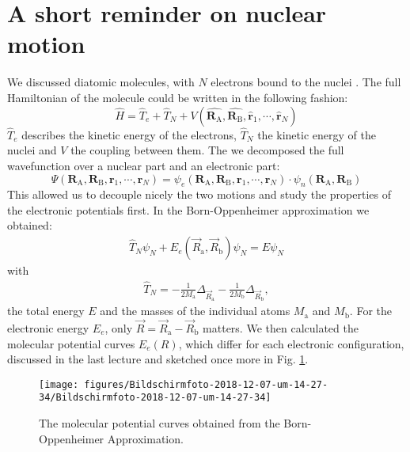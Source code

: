 \documentclass[10pt]{article}
\let\cite\citep
\providecommand\citep{\cite}
\newcommand{\vecRA}{\mathbf{R}_\mathrm{A}}
\newcommand{\vecRB}{\mathbf{R}_\mathrm{B}}
\begin{document}
\section{A short reminder on nuclear motion}
We discussed diatomic molecules, with $N$ electrons bound to the nuclei  \cite{molecules}. The full Hamiltonian of the molecule could be written in the following fashion:
\begin{equation}
\hat{H} = \hat{T}_e + \hat{T}_N + V(\hat{\vecRA}, \hat{\vecRB},\hat{\mathbf{r}}_1,\cdots, \hat{\mathbf{r}}_N)
\end{equation}
$\hat{T}_e$ describes the kinetic energy of the electrons, $\hat{T}_N$ the kinetic energy of the nuclei and $V$ the coupling between them. The we decomposed the full wavefunction over a nuclear part and an electronic part:
\begin{equation}
\Psi(\vecRA, \vecRB, \mathbf{r}_1,\cdots, \mathbf{r}_N) = \psi_e(\vecRA, \vecRB, \mathbf{r}_1,\cdots, \mathbf{r}_N)\cdot \psi_n(\vecRA, \vecRB)
\end{equation}
This allowed us to decouple nicely the two motions and study the properties of the electronic potentials first. In the Born-Oppenheimer approximation we obtained:
\begin{align}\label{Eq:NuclearMotion}
\hat{T}_N \psi_N + E_e (\vec{R}_\textrm{a}, \vec{R}_\textrm{b}) \psi_N = E \psi_N
\end{align}
%
with
\begin{align}
\hat{T}_N = - \frac{1}{2 M_\textrm{a}} \Delta_{\vec{R}_\textrm{a}} - \frac{1}{2 M_\textrm{b}} \Delta_{\vec{R}_\textrm{b}},
\end{align}
the total energy $E$ and the masses of the individual atoms $M_\textrm{a}$ and $M_\textrm{b}$.
For the electronic energy $E_e$, only $\vec{R} = \vec{R}_\textrm{a} - \vec{R}_\textrm{b}$ matters. We then calculated the molecular potential curves $E_e(R)$, which differ for each electronic configuration, discussed in the last lecture \cite{moleculesa} and sketched once more in Fig. \ref{907917}.
\begin{figure}[h!]
\begin{center}
\texttt{[image: figures/Bildschirmfoto-2018-12-07-um-14-27-34/Bildschirmfoto-2018-12-07-um-14-27-34]}
\caption{{The molecular potential curves obtained from the Born-Oppenheimer
Approximation.
{\label{907917}}%
}}
\end{center}
\end{figure}
\end{document}
